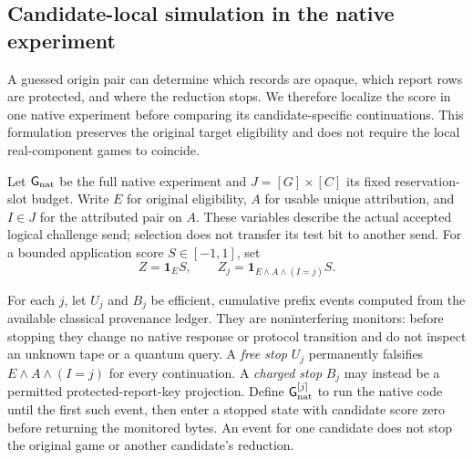 \subsection{Candidate-local simulation in the native experiment}
\label{sec:candidate-local-accounting}

A guessed origin pair can determine which records are opaque, which report
rows are protected, and where the reduction stops.  We therefore localize
the score in one native experiment before comparing its candidate-specific
continuations.  This formulation preserves the original target eligibility
and does not require the local real-component games to coincide.

Let $\mathsf G_{\rm nat}$ be the full native experiment and
$J=[G]\times[C]$ its fixed reservation-slot budget.  Write $E$ for original
eligibility, $A$ for usable unique attribution, and $I\in J$ for the attributed
pair on $A$.  These variables describe the actual accepted logical challenge
send; selection does not transfer its test bit to another send.  For a bounded
application score $S\in[-1,1]$, set
\[
 Z=\mathbf1_E S,\qquad
 Z_j=\mathbf1_{E\land A\land(I=j)}S.
\]

For each $j$, let $U_j$ and $B_j$ be efficient, cumulative prefix events
computed from the available classical provenance ledger.  They are
noninterfering monitors: before stopping they change no native response or
protocol transition and do not inspect an unknown tape or a quantum query.
A \emph{free stop} $U_j$ permanently falsifies $E\land A\land(I=j)$ for every
continuation.  A \emph{charged stop} $B_j$ may instead be a permitted
protected-report-key projection.  Define $\mathsf G_{\rm nat}^{[j]}$ to run
the native code until the first such event, then enter a stopped state with
candidate score zero before returning the monitored bytes.  An event for one
candidate does not stop the original game or another candidate's reduction.

